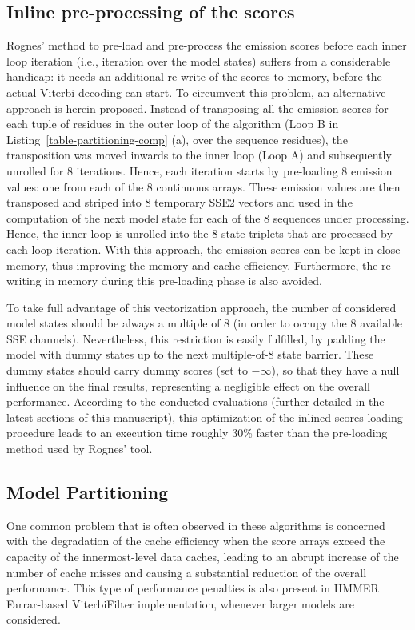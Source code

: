 \documentclass{bmcart}
\begin{document}
\subsection*{Inline pre-processing of the scores}

Rognes' method to pre-load and pre-process the emission scores before each inner loop iteration (i.e., iteration over the model states) suffers from a considerable handicap: it needs an additional re-write of the scores to memory, before the actual Viterbi decoding can start. To circumvent this problem, an alternative approach is herein proposed. Instead of transposing all the emission scores for each tuple of residues in the outer loop of the algorithm (Loop B in Listing~\autoref{table-partitioning-comp} (a), over the sequence residues), the transposition was moved inwards to the inner loop (Loop A) and subsequently unrolled for 8 iterations. Hence, each iteration starts by pre-loading 8 emission values: one from each of the 8 continuous arrays. These emission values are then transposed and striped into 8 temporary SSE2 vectors and used in the computation of the next model state for each of the 8 sequences under processing. Hence, the inner loop is unrolled into the 8 state-triplets that are processed by each loop iteration. With this approach, the emission scores can be kept in close memory, thus improving the memory and cache efficiency. Furthermore, the re-writing in memory during this pre-loading phase is also avoided.

To take full advantage of this vectorization approach, the number of considered model states should be always a multiple of 8 (in order to occupy the 8 available SSE channels). Nevertheless,  this restriction is easily fulfilled, by padding the model with dummy states up to the next multiple-of-8 state barrier. These dummy states should carry dummy scores (set to $-\infty$), so that they have a null influence on the final results, representing a negligible effect on the overall performance. According to the conducted evaluations (further detailed in the latest sections of this manuscript), this optimization of the inlined scores loading procedure leads to an execution time roughly 30\% faster than the pre-loading method used by Rognes' tool.

\subsection*{Model Partitioning }

One common problem that is often observed in these algorithms is concerned with the degradation of the cache efficiency when the score arrays exceed the capacity of the innermost-level data caches, leading to an abrupt increase of the number of cache misses and causing a substantial reduction of the overall performance. This type of performance penalties is also present in HMMER Farrar-based ViterbiFilter implementation, whenever larger models are considered. 
\end{document}
